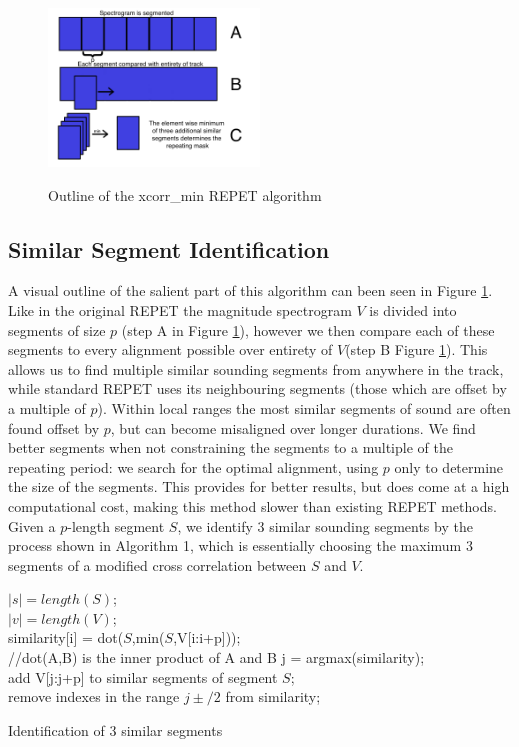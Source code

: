 \documentclass{article}
\begin{document}
\begin{figure}[h]
	\caption{Outline of the xcorr\_min REPET algorithm}
	\includegraphics[width=0.5\textwidth]{figs/xcorr_min.png}
	\label{fig:REPET}
\end{figure}

\subsection{Similar Segment Identification}

A visual outline of the salient part of this algorithm can been seen in Figure \ref{fig:REPET}. Like in the original REPET the magnitude spectrogram $V$ is divided into segments of size $p$ (step A in Figure \ref{fig:REPET}), however we then compare each of these segments to every alignment possible over entirety of $V$(step B Figure \ref{fig:REPET}). This allows us to find multiple similar sounding segments from anywhere in the track, while standard REPET uses its neighbouring segments (those which are offset by a multiple of $p$). Within local ranges the most similar segments of sound are often found offset by $p$, but can become misaligned over longer durations. We find better segments when not constraining the segments to a multiple of the repeating period: we search for the optimal alignment, using $p$ only to determine the size of the segments. This provides for better results, but does come at a high computational cost, making this method slower than existing REPET methods.  Given a $p$-length segment $S$, we identify 3 similar sounding segments by the process shown in Algorithm 1, which is essentially choosing the maximum 3 segments of a modified cross correlation between $S$ and $V$.

\begin{algorithm}
		$\vert s \vert = length(S)$;\\
		$\vert v \vert = length(V)$;\\
		 { 
			similarity[i] = dot($S$,min($S$,V[i:i+p]));\\
			//dot(A,B) is the inner product of A and B
		}
		 {
			j = argmax(similarity);\\
			add V[j:j+p] to similar segments of segment $S$;\\
			remove indexes in the range $j \pm /2$ from similarity;\\
		}
	\caption{Identification of 3 similar segments}
\end{algorithm}
\end{document}
